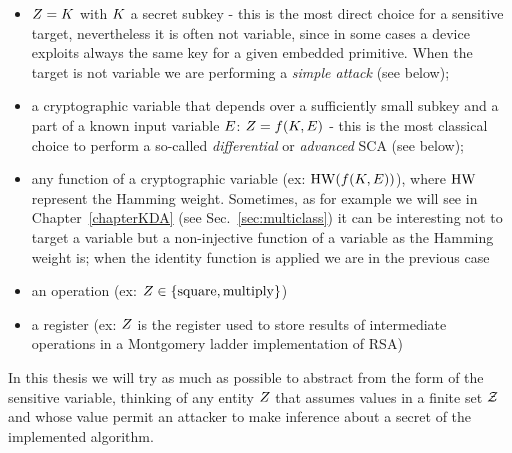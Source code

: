 \begin{itemize}
\item $Z = K$ with $K$ a secret subkey - this is the most direct choice for a sensitive target, nevertheless it is often not variable, since in some cases a device exploits always the same key for a given embedded primitive. When the target is not variable we are performing a \emph{simple attack} (see below);
\item a cryptographic variable that depends over a sufficiently small subkey and a part of a known input variable $E$: $Z = f(K,E)$ - this is the most classical choice to perform a so-called \emph{differential} or \emph{advanced} SCA (see below);
\item any function of a cryptographic variable (ex: $\mathrm{HW}(f(K,E))$), where $\mathrm{HW}$ represent the Hamming weight. Sometimes, as for example we will see in Chapter~\ref{chapterKDA} (see Sec.~\ref{sec:multiclass}) it can be interesting not to target a variable but a non-injective function of a variable as the Hamming weight is; when the identity function is applied we are in the previous case
\item an operation (ex: $Z \in \{\mathrm{square}, \mathrm{multiply}\}$)
\item a register (ex: $Z$ is the register used to store results of intermediate operations in a Montgomery ladder implementation of RSA)
\end{itemize}
In this thesis we will try as much as possible to abstract from the form of the sensitive variable, thinking of any entity $Z$ that assumes values in a finite set $\mathcal{Z}$ and whose value permit an attacker to make inference about a secret of the implemented algorithm.

